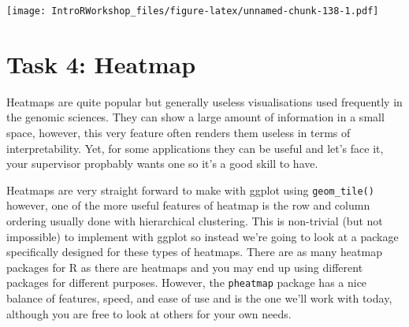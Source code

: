 \documentclass[]{book}
\newenvironment{Shaded}{\begin{snugshade}}{\end{snugshade}}
\newcommand{\DataTypeTok}[1]{\textcolor[rgb]{0.13,0.29,0.53}{#1}}
\newcommand{\KeywordTok}[1]{\textcolor[rgb]{0.13,0.29,0.53}{\textbf{#1}}}
\newcommand{\NormalTok}[1]{#1}
\newcommand{\OperatorTok}[1]{\textcolor[rgb]{0.81,0.36,0.00}{\textbf{#1}}}
\newcommand{\StringTok}[1]{\textcolor[rgb]{0.31,0.60,0.02}{#1}}
\begin{document}
\begin{Shaded}
\end{Shaded}

\texttt{[image: IntroRWorkshop\_files/figure-latex/unnamed-chunk-138-1.pdf]}

\hypertarget{task-4-heatmap}{%
\section*{Task 4: Heatmap}\label{task-4-heatmap}}

Heatmaps are quite popular but generally useless visualisations used frequently in the genomic sciences. They can show a large amount of information in a small space, however, this very feature often renders them useless in terms of interpretability. Yet, for some applications they can be useful and let's face it, your supervisor propbably wants one so it's a good skill to have.

Heatmaps are very straight forward to make with ggplot using \texttt{geom\_tile()} however, one of the more useful features of heatmap is the row and column ordering usually done with hierarchical clustering. This is non-trivial (but not impossible) to implement with ggplot so instead we're going to look at a package specifically designed for these types of heatmaps. There are as many heatmap packages for R as there are heatmaps and you may end up using different packages for different purposes. However, the \texttt{pheatmap} package has a nice balance of features, speed, and ease of use and is the one we'll work with today, although you are free to look at others for your own needs.
\end{document}
